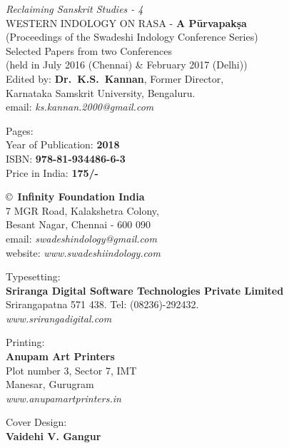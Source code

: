 \thispagestyle{empty}

\noindent
{\fontsize{9}{11}\selectfont\sl Reclaiming Sanskrit Studies - 4}\\
WESTERN INDOLOGY ON RASA - {\bfseries A Pūrvapakṣa}\\ 
(Proceedings of the Swadeshi Indology Conference Series)\\
Selected Papers from two Conferences\\ 
(held in July 2016 (Chennai) \& February 2017 (Delhi))\\
Edited by: {\bf Dr.\ K.S.\ Kannan}, Former Director,\\ 
Karnataka Samskrit University, Bengaluru.\\
email: {\sl ks.kannan.2000@gmail.com}
\vfill

\noindent
Pages: {\bf\pageref{bookend}}\\
Year of Publication: {\bf 2018}\\
ISBN: {\bf 978-81-934486-6-3}\\
Price in India: {\bf 175/-}
\vfill

\noindent
\copyright\ {\bf Infinity Foundation India}\\ 
7 MGR Road, Kalakshetra Colony,\\ 
Besant Nagar, Chennai - 600 090\\
email: {\sl swadeshindology@gmail.com}\\
website: {\sl www.swadeshiindology.com} 
\vfill

\noindent
Typesetting:\\ 
{\bf Sriranga Digital Software Technologies Private Limited}\\ 
Srirangapatna 571 438. Tel: (08236)-292432.\\
{\sl www.srirangadigital.com}
\vfill

\noindent
Printing:\\
{\bf Anupam Art Printers}\\
Plot number 3, Sector 7, IMT\\
Manesar, Gurugram\\
{\sl www.anupamartprinters.in}
\noindent

\bigskip

Cover Design:\\ 
{\bf Vaidehi V. Gangur}
